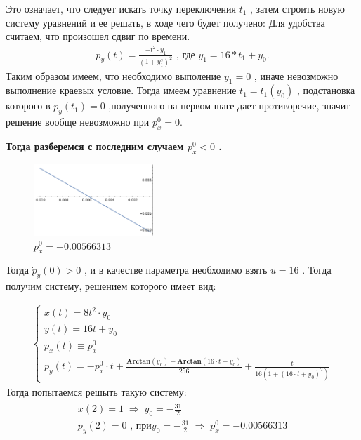 \documentclass[a4paper,12pt]{article}
\begin{document}
Это означает, что следует искать точку переключения $t_1$ , затем строить новую систему уравнений и ее решать, в ходе чего будет получено:
Для удобства считаем, что произошел сдвиг по времени.
\begin{align*}
    p_y(t)=\frac{- t^2\cdot y_1}{(1+y_1^2)^2}\text{ , где }y_1=16*t_1+y_0.
\end{align*}
Таким образом имеем, что необходимо выполение $y_1=0$ , иначе невозможно выполнение краевых условие. Тогда имеем уравнение $t_1=t_1(y_0)$ , подстановка которого в $p_y(t_1)=0$ ,полученного на первом шаге дает противоречие, значит решение вообще невозможно при $p_x^0=0$.

\textbf{ Тогда разберемся с последним случаем $p_x^0<0$ .}

\begin{figure}
    \includegraphics[width=0.4\textwidth]{img4.png}
    \caption{$p_x^0=-0.00566313$}
\end{figure}

Тогда $\dot p_y(0)>0$ , и в качестве параметра необходимо взять $u=16$ . Тогда получим систему, решением которого имеет вид:

\begin{align*}
    \left\{
        \begin{array}{l}
            x(t)=8 t^2\cdot y_0\\
            y(t)=16 t+y_0\\
            p_x(t) \equiv p_x^0\\
            p_y(t)=-p_x^0\cdot t+\frac{\mathbf{Arctan}(y_0)-\mathbf{Arctan}(16\cdot t+y_0)}{256}+\frac{t}{16(1+(16\cdot t+y_0)^2)}
        \end{array}
    \right.
\end{align*}
Тогда попытаемся решыть такую систему:
\begin{align*}
    \begin{array}{l}
        x(2)=1\;\Rightarrow \; y_0=-\frac{31}{2}\\
        p_y(2)=0\text{ , при} y_0=-\frac{31}{2} \; \Rightarrow \; p_x^0=-0.00566313
    \end{array}
\end{align*}
\end{document}
